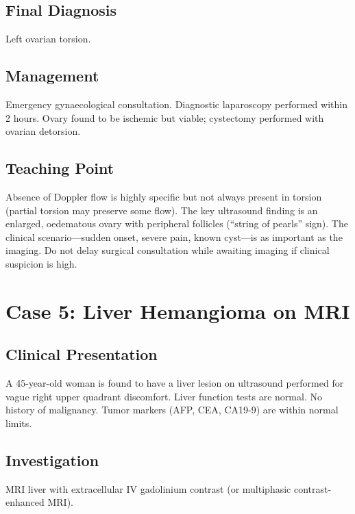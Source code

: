 \subsection{Final Diagnosis}
Left ovarian torsion.

\subsection{Management}
Emergency gynaecological consultation. Diagnostic laparoscopy performed within 2 hours. Ovary found to be ischemic but viable; cystectomy performed with ovarian detorsion.

\subsection{Teaching Point}
Absence of Doppler flow is highly specific but not always present in torsion (partial torsion may preserve some flow). The key ultrasound finding is an enlarged, oedematous ovary with peripheral follicles (``string of pearls'' sign). The clinical scenario---sudden onset, severe pain, known cyst---is as important as the imaging. Do not delay surgical consultation while awaiting imaging if clinical suspicion is high.

\clearpage

\section{Case 5: Liver Hemangioma on MRI}

\subsection{Clinical Presentation}
A 45-year-old woman is found to have a liver lesion on ultrasound performed for vague right upper quadrant discomfort. Liver function tests are normal. No history of malignancy. Tumor markers (AFP, CEA, CA19-9) are within normal limits.

\subsection{Investigation}
MRI liver with extracellular IV gadolinium contrast (or multiphasic contrast-enhanced MRI).

